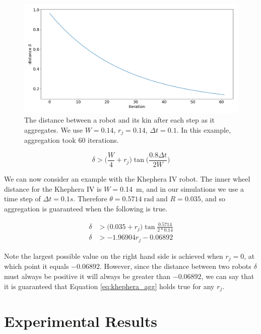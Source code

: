 \documentclass[conference]{IEEEtran}
\begin{document}
  \begin{figure}
    \centering
    \includegraphics[width=1\linewidth]{./images/dist_plot.png}
    \caption{The distance between a robot and its kin after each step as it aggregates. We use $W=0.14$, $r_j=0.14$, $\Delta t=0.1$. In this example, aggregation took 60 iterations.}
    \label{fig:dist_plot}
  \end{figure}

  \begin{equation*} \label{eq:agg_final_result}
    \delta > \bigg(\frac{W}{4} + r_j\bigg)\tan\bigg(\frac{0.8\Delta t}{2W}\bigg)
  \end{equation*}

  We can now consider an example with the Khephera IV robot. The inner wheel distance for the Khephera IV is $W=$\SI{0.14}{\meter}, and in our simulations we use a time step of $\Delta t = 0.1s$. Therefore $\theta = 0.5714\;\text{rad}$ and $R=0.035$, and so aggregation is guaranteed when the following is true.

  \begin{equation} \label{eq:khephera_agg}
    \begin{split}
      \delta &> \bigg(0.035 + r_j\bigg)\tan\frac{0.5714}{2*0.14} \\
      \delta &> -1.96904 r_j - 0.06892
    \end{split}
  \end{equation}

   Note the largest possible value on the right hand side is achieved when $r_j=0$, at which point it equals $-0.06892$. However, since the distance between two robots $\delta$ must always be positive it will always be greater than $-0.06892$, we can say that it is guaranteed that Equation \ref{eq:khephera_agg} holds true for any $r_j$.

\section{Experimental Results}
\end{document}
